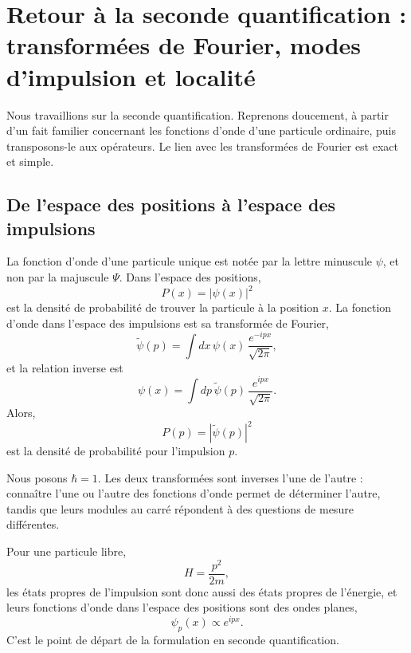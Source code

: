\section{Retour à la seconde quantification : transformées de Fourier, modes d’impulsion et localité}

Nous travaillions sur la seconde quantification. Reprenons doucement, à partir d’un fait familier concernant les fonctions d’onde d’une particule ordinaire, puis transposons-le aux opérateurs. Le lien avec les transformées de Fourier est exact et simple.

\subsection{De l’espace des positions à l’espace des impulsions}

La fonction d’onde d’une particule unique est notée par la lettre minuscule \(\psi\), et non par la majuscule \(\Psi\). Dans l’espace des positions,
\begin{equation}
P(x)=|\psi(x)|^2
\end{equation}
est la densité de probabilité de trouver la particule à la position \(x\). La fonction d’onde dans l’espace des impulsions est sa transformée de Fourier,
\begin{equation}
\tilde{\psi}(p)=\int dx\,\psi(x)\,\frac{e^{-ipx}}{\sqrt{2\pi}},
\end{equation}
et la relation inverse est
\begin{equation}
\psi(x)=\int dp\,\tilde{\psi}(p)\,\frac{e^{ipx}}{\sqrt{2\pi}}.
\end{equation}
Alors,
\begin{equation}
P(p)=|\tilde{\psi}(p)|^2
\end{equation}
est la densité de probabilité pour l’impulsion \(p\).

Nous posons \(\hbar=1\). Les deux transformées sont inverses l’une de l’autre : connaître l’une ou l’autre des fonctions d’onde permet de déterminer l’autre, tandis que leurs modules au carré répondent à des questions de mesure différentes.

Pour une particule libre,
\begin{equation}
H=\frac{p^2}{2m},
\end{equation}
les états propres de l’impulsion sont donc aussi des états propres de l’énergie, et leurs fonctions d’onde dans l’espace des positions sont des ondes planes,
\begin{equation}
\psi_p(x)\propto e^{ipx}.
\end{equation}
C’est le point de départ de la formulation en seconde quantification.

